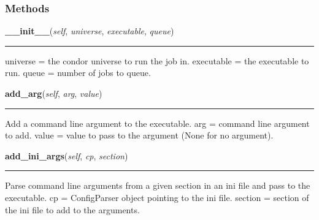   \subsubsection{Methods}

    \label{pipeline:CondorJob:__init__}
    \vspace{0.5ex}

    \noindent\begin{boxedminipage}{\textwidth}

    \raggedright \textbf{\_\_init\_\_}(\textit{self}, \textit{universe}, \textit{executable}, \textit{queue})

    \vspace{-1.5ex}

    \rule{\textwidth}{0.5\fboxrule}
    universe = the condor universe to run the job in. executable = the 
    executable to run. queue = number of jobs to queue.

    \vspace{1ex}

    \end{boxedminipage}

    \label{pipeline:CondorJob:add_arg}
    \vspace{0.5ex}

    \noindent\begin{boxedminipage}{\textwidth}

    \raggedright \textbf{add\_arg}(\textit{self}, \textit{arg}, \textit{value})

    \vspace{-1.5ex}

    \rule{\textwidth}{0.5\fboxrule}
    Add a command line argument to the executable. arg = command line 
    argument to add. value = value to pass to the argument (None for no 
    argument).

    \vspace{1ex}

    \end{boxedminipage}

    \label{pipeline:CondorJob:add_ini_args}
    \vspace{0.5ex}

    \noindent\begin{boxedminipage}{\textwidth}

    \raggedright \textbf{add\_ini\_args}(\textit{self}, \textit{cp}, \textit{section})

    \vspace{-1.5ex}

    \rule{\textwidth}{0.5\fboxrule}
    Parse command line arguments from a given section in an ini file and 
    pass to the executable. cp = ConfigParser object pointing to the ini 
    file. section = section of the ini file to add to the arguments.

    \vspace{1ex}

    \end{boxedminipage}

